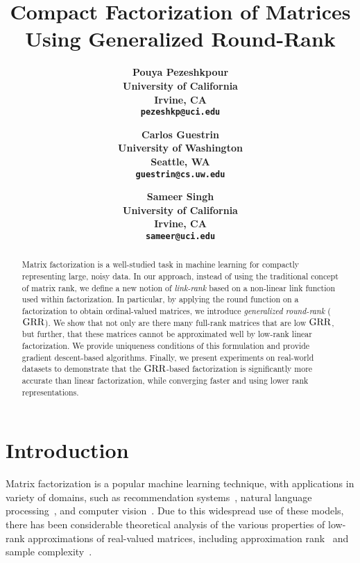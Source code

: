 \documentclass{article}
\title{Compact Factorization of Matrices Using Generalized Round-Rank}
\author{
	\bf Pouya Pezeshkpour\\
	University of California\\
	Irvine, CA\\\texttt{pezeshkp@uci.edu} \\
    \and
    \bf Carlos Guestrin\\
	University of Washington \\
	Seattle, WA\\
	\texttt{guestrin@cs.uw.edu} \\
	\and
    \bf Sameer Singh \\
	University of California\\
	Irvine, CA\\
	\texttt{sameer@uci.edu} \\
}
\date{}
\begin{document}
\maketitle

\begin{abstract}
Matrix factorization is a well-studied task in machine learning for compactly representing large, noisy data. In our approach, instead of using the traditional concept of matrix rank, we define a new notion of \emph{link-rank} based on a non-linear link function used within factorization. In particular, by applying the round function on a factorization to obtain ordinal-valued matrices, we introduce \emph{generalized round-rank} ($\text{GRR}$). We show that not only are there many full-rank matrices that are low $\text{GRR}$, but further, that these matrices cannot be approximated well by low-rank linear factorization. We provide uniqueness conditions of this formulation and provide gradient descent-based algorithms. Finally, we present experiments on real-world datasets to demonstrate that the $\text{GRR}$-based factorization is significantly more accurate than linear factorization, while converging faster and using lower rank representations.  
\end{abstract}

\section{Introduction}
\label{sec:intro}

Matrix factorization is a popular machine learning technique, with applications in variety of domains, such as recommendation systems~\citep{lawrence09:non-linear,salakhutdinov08:probabilistic}, natural language processing~\citep{riedel13:relation}, and computer vision~\citep{huang03:learning}.
Due to this widespread use of these models, there has been considerable theoretical analysis of the various properties of low-rank approximations of real-valued matrices, including approximation rank~\citep{alon13:the-approximate,davenport14:1-bit} and sample complexity~\citep{balcan2017optimal}.
\end{document}
